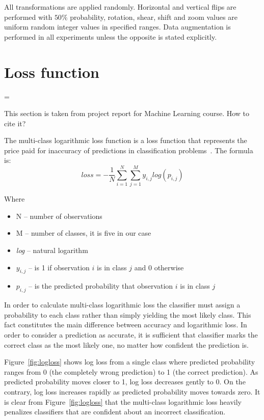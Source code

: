 \documentclass[a4paper, 11pt, table]{article}
\newenvironment{warning}
  {\par\begin{mdframed}[linewidth=2pt,linecolor=red]%
    \begin{list}{}{\leftmargin=1cm
                   \labelwidth=\leftmargin}\item[\Large\ding{43}]}
  {\end{list}\end{mdframed}\par}
\begin{document}
All transformations are applied randomly. Horizontal and vertical flips are performed with $50\%$ probability, rotation, shear, shift and zoom values are uniform random integer values in specified ranges. Data augmentation is performed in all experiments unless the opposite is stated explicitly.

\section{Loss function}
\label{sec:loss_function}

\begin{warning}
This section is taken from project report for Machine Learning course. How to cite it?
\end{warning}

The multi-class logarithmic loss function is a loss function that represents the price paid for inaccuracy of predictions in classification problems~\cite{rosasco}. The formula is:
\begin{equation}
loss = -\frac{1}{N} \sum_{i=1}^{N} \sum_{j=1}^{M} y_{i,j} log(p_{i,j})
\end{equation}

Where 
\begin{itemize}
\item N -- number of observations
\item M -- number of classes, it is five in our case
\item \textit{log} -- natural logarithm
\item $y_{i,j}$ -- is 1 if observation $i$ is in class $j$ and 0 otherwise
\item $p_{i,j}$ --  is the predicted probability that observation $i$ is in class $j$
\end{itemize}

In order to calculate multi-class logarithmic loss the classifier must assign a probability to each class rather than simply yielding the most likely class. This fact constitutes the main difference between accuracy and logarithmic loss. In order to consider a prediction as accurate, it is sufficient that classifier marks the correct class as the most likely one, no matter how confident the prediction is.

Figure~\ref{fig:logloss} shows log loss from a single class where predicted probability ranges from 0 (the completely wrong prediction) to 1 (the correct prediction). As predicted probability moves closer to 1, log loss decreases gently to 0. On the contrary, log loss increases rapidly as predicted probability moves towards zero. It is clear from Figure~\ref{fig:logloss} that the multi-class logarithmic loss heavily penalizes classifiers that are confident about an incorrect classification.
\end{document}
